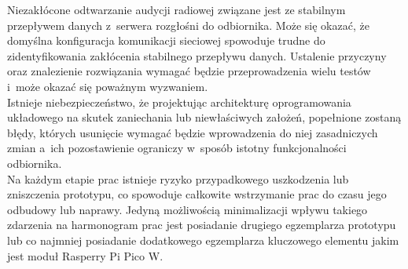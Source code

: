 \documentclass[polish]{aghengthesis}
\begin{document}
		Niezakłócone odtwarzanie audycji radiowej związane jest ze stabilnym przepływem danych z~serwera rozgłośni do odbiornika. Może się okazać, że domyślna konfiguracja komunikacji sieciowej spowoduje trudne do zidentyfikowania zakłócenia stabilnego przepływu danych. Ustalenie przyczyny oraz znalezienie rozwiązania wymagać będzie przeprowadzenia wielu testów i~może okazać się poważnym wyzwaniem.
		$ $\\
		
		Istnieje niebezpieczeństwo, że projektując architekturę oprogramowania układowego na skutek zaniechania lub niewłaściwych założeń, popełnione zostaną błędy, których usunięcie wymagać będzie wprowadzenia do niej zasadniczych zmian a~ich pozostawienie ograniczy w~sposób istotny funkcjonalności odbiornika. 
		$ $\\
		
		Na każdym etapie prac istnieje ryzyko przypadkowego uszkodzenia lub zniszczenia prototypu, co spowoduje całkowite wstrzymanie prac do czasu jego odbudowy lub naprawy. Jedyną możliwością minimalizacji wpływu takiego zdarzenia na harmonogram prac jest posiadanie drugiego egzemplarza prototypu lub co najmniej posiadanie dodatkowego egzemplarza kluczowego elementu jakim jest moduł Rasperry Pi Pico W.
	
\end{document}
